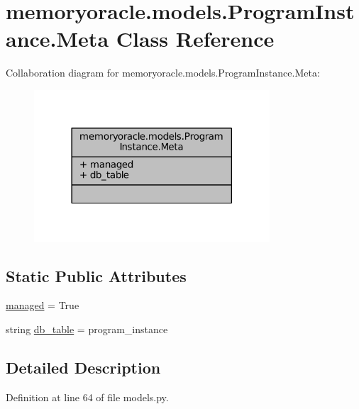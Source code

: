\hypertarget{classmemoryoracle_1_1models_1_1ProgramInstance_1_1Meta}{}\section{memoryoracle.\+models.\+Program\+Instance.\+Meta Class Reference}
\label{classmemoryoracle_1_1models_1_1ProgramInstance_1_1Meta}


Collaboration diagram for memoryoracle.\+models.\+Program\+Instance.\+Meta\+:
\nopagebreak
\begin{figure}[H]
\begin{center}
\leavevmode
\includegraphics[width=249pt]{classmemoryoracle_1_1models_1_1ProgramInstance_1_1Meta__coll__graph}
\end{center}
\end{figure}
\subsection*{Static Public Attributes}
\begin{DoxyCompactItemize}
\item 
\hyperlink{classmemoryoracle_1_1models_1_1ProgramInstance_1_1Meta_a73845fb87f4712a15e46ca9bbafbefd6}{managed} = True
\item 
string \hyperlink{classmemoryoracle_1_1models_1_1ProgramInstance_1_1Meta_a307135b242797eec23578567cd518b1d}{db\+\_\+table} = \textquotesingle{}program\+\_\+instance\textquotesingle{}
\end{DoxyCompactItemize}


\subsection{Detailed Description}


Definition at line 64 of file models.\+py.



